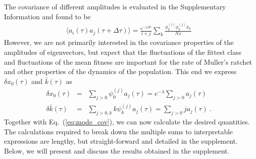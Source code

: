 \documentclass[rmp,preprint]{revtex4}
\newcommand{\EQ}[1]{Eq.~(\ref{eq:#1})}
\newcommand{\x}{x}
\newcommand{\xs}{\bar{\x}}
\newcommand{\dx}{\delta \x}
\newcommand{\dk}{\delta \bar{k}}
\newcommand{\mr}[1]{\psi^{(#1)}}
\newcommand{\ml}[1]{\phi^{(#1)}}
\begin{document}
The covariance of different amplitudes is evaluated in the Supplementary Information and found to be
\begin{equation}
\label{eq:mode_cov}
\begin{split}
\langle a_i(\tau) a_j(\tau+\Delta \tau)\rangle = \frac{e^{-j \Delta \tau }}{i+j}\sum_{k} \frac{\ml{i}_k\ml{j}_k\xs_k}{Ns}
\end{split}
\end{equation}
However, we are not primarily interested in the covariance properties of the amplitudes of eigenvectors, but expect that the fluctuations of the fittest class and fluctuations of the mean fitness are important for the rate of Muller's ratchet and other properties of the dynamics of the population.
This end we express $\dx_0(\tau)$ and $\bar{k}(\tau)$ as 
\begin{eqnarray}
\dx_0(\tau) &=& \sum_{j>0} \mr{j}_0 a_j(\tau)  = e^{-\lambda} \sum_{j>0} a_j(\tau)\\
\dk(\tau) &=& \sum_{j>0,k} k\mr{j}_k a_j(\tau) =  \sum_{j>0} j a_j(\tau) \ .
\end{eqnarray}
Together with \EQ{mode_cov}, we can now calculate the desired quantities. The calculations required to break down the multiple sums to interpretable expressions are lengthy, but straight-forward and detailed in the supplement. Below, we will present and discuss the results obtained in the supplement.
\end{document}
